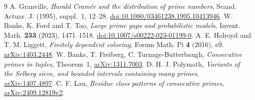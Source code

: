 \documentclass[11pt]{article}
\begin{document}
\begin{thebibliography}{9}
A. Granville, \emph{Harald Cram\'er and the distribution of prime
numbers}, Scand. Actuar. J. (1995), suppl.~1, 12--28.
\href{https://doi.org/10.1080/03461238.1995.10413946}{doi:10.1080/03461238.1995.10413946}.
W. Banks, K. Ford and T. Tao, \emph{Large prime gaps and probabilistic
models}, Invent. Math. \textbf{233} (2023), 1471--1518.
\href{https://doi.org/10.1007/s00222-023-01199-0}{doi:10.1007/s00222-023-01199-0}.
A. E. Holroyd and T. M. Liggett, \emph{Finitely dependent coloring},
Forum Math. Pi \textbf{4} (2016), e9.
\href{https://arxiv.org/abs/1403.2448}{arXiv:1403.2448}.
 W. Banks, T. Freiberg, C. Turnage-Butterbaugh,
\emph{Consecutive primes in tuples}, Theorem~1,
\href{https://arxiv.org/abs/1311.7003}{arXiv:1311.7003}.
 D. H. J. Polymath, \emph{Variants of the Selberg
sieve, and bounded intervals containing many primes},
\href{https://arxiv.org/abs/1407.4897}{arXiv:1407.4897}.
 C. F. Lau, \emph{Residue class patterns of consecutive primes},
\href{https://arxiv.org/html/2409.12819v2}{arXiv:2409.12819v2}.
\end{thebibliography}
\end{document}
